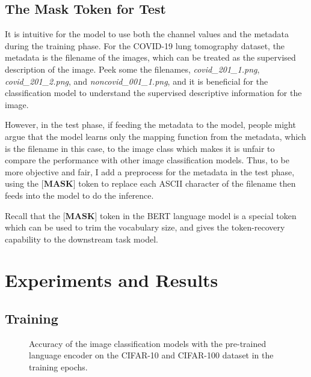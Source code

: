 \documentclass[review]{cvpr}
\begin{document}
\subsection{The Mask Token for Test}

\par It is intuitive for the model to use both the channel values and the metadata during the training phase.
For the COVID-19 lung tomography dataset, the metadata is the filename of the images, which can be treated as the supervised description of the image.
Peek some the filenames, \eg \textit{covid\_201\_1.png}, \textit{covid\_201\_2.png}, and \textit{noncovid\_001\_1.png},
and it is beneficial for the classification model to understand the supervised descriptive information for the image.

\par However, in the test phase, if feeding the metadata to the model, people might argue that the model learns only the mapping function from
the metadata, which is the filename in this case, to the image class
which makes it is unfair to compare the performance with other image classification models.
Thus, to be more objective and fair, I add a preprocess for the metadata in the test phase, using the $\textbf{[MASK]}$ token to replace each
ASCII character of the filename then feeds into the model to do the inference.

\par Recall that the $\textbf{[MASK]}$ token in the BERT language model is a special token which can be used to trim the vocabulary size,
and gives the token-recovery capability to the downstream task model.



\section{Experiments and Results}


\subsection{Training}

\begin{figure*}
\begin{center}
\end{center}
   \caption{Accuracy of the image classification models with the pre-trained language encoder on the CIFAR-10 and CIFAR-100 dataset in the training epochs.}
\label{fig:short}
\end{figure*}
\end{document}
